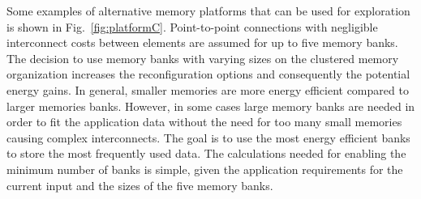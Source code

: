 Some examples of alternative memory platforms that can be used for exploration is shown in Fig.~\ref{fig:platformC}. 
Point-to-point connections with negligible interconnect costs between elements are assumed for up to five memory banks. 
The decision to use memory banks with varying sizes on the clustered memory organization increases the reconfiguration options and consequently the potential energy gains. 
In general, smaller memories are more energy efficient compared to larger memories banks. 
However, in some cases large memory banks are needed in order to fit the application data without the need for too many small memories causing complex interconnects. 
The goal is to use the most energy efficient banks to store the most frequently used data. 
The calculations needed for enabling the minimum number of banks is simple, given the application requirements for the current input and the sizes of the five memory banks.

